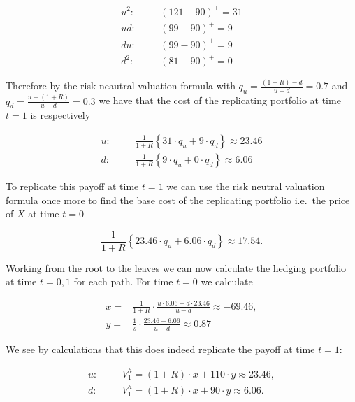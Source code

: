 \documentclass[
]{article}
\begin{document}
\begin{align*}
u^2:\hspace{20pt}&(121-90)^+=31\\
ud:\hspace{20pt}&(99-90)^+=9\\
du:\hspace{20pt}&(99-90)^+=9\\
d^2:\hspace{20pt}&(81-90)^+=0
\end{align*}

Therefore by the risk neautral valuation formula with
\(q_u=\frac{(1+R)-d}{u-d}=0.7\) and \(q_d=\frac{u-(1+R)}{u-d}=0.3\) we
have that the cost of the replicating portfolio at time \(t=1\) is
respectively

\begin{align*}
u:\hspace{20pt}&\frac{1}{1+R}\left\{31\cdot q_u + 9 \cdot q_d\right\}\approx 23.46\\
d:\hspace{20pt}&\frac{1}{1+R}\left\{9\cdot q_u + 0 \cdot q_d\right\}\approx 6.06
\end{align*}

To replicate this payoff at time \(t=1\) we can use the risk neutral
valuation formula once more to find the base cost of the replicating
portfolio i.e.~the price of \(X\) at time \(t=0\)

\[
\frac{1}{1+R}\left\{23.46\cdot q_u + 6.06 \cdot q_d\right\}\approx 17.54.
\]

Working from the root to the leaves we can now calculate the hedging
portfolio at time \(t=0,1\) for each path. For time \(t=0\) we calculate

\begin{align*}
x=&\frac{1}{1+R}\cdot \frac{u\cdot 6.06-d\cdot 23.46}{u-d}\approx -69.46,\\
y=&\frac{1}{s}\cdot\frac{23.46-6.06}{u-d}\approx0.87
\end{align*}

We see by calculations that this does indeed replicate the payoff at
time \(t=1\):

\begin{align*}
u:\hspace{20pt}&V_1^h=(1+R)\cdot x + 110\cdot y\approx 23.46,\\
d:\hspace{20pt}&V_1^h=(1+R)\cdot x + 90\cdot y\approx 6.06.
\end{align*}
\end{document}
